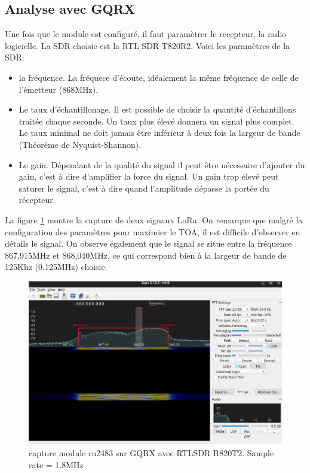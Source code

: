\subsection{Analyse avec GQRX}

Une fois que le module est configuré, il faut paramètrer le recepteur, la radio logicielle. La SDR choisie est la RTL SDR T820R2. Voici les paramètres de la SDR:

\vspace{0.1cm}

\begin{itemize}
\item la fréquence. La fréquece d'écoute, idéalement la même fréquence de celle de l'émetteur (868MHz).
\item Le taux d'échantillonage. Il est possible de choisir la quantité d'échantillons traitée chaque seconde. Un taux plus élevé donnera un signal plus complet. Le taux minimal ne doit jamais être inférieur à deux fois la largeur de bande (Théorème de Nyquist-Shannon).
\item Le gain. Dépendant de la qualité du signal il peut être nécessaire d'ajouter du gain, c'est à dire d'amplifier la force du signal. Un gain trop élevé peut saturer le signal, c'est à dire quand l'amplitude dépasse la portée du récepteur.
\end{itemize}

\vspace{0.1cm}

La figure \ref{term301} montre la capture de deux signaux LoRa. On remarque que malgré la configuration des paramètres pour maximier le TOA, il est difficile d'observer en détails le signal. On observe également que le signal se situe entre la fréquence 867,915MHz et 868,040MHz, ce qui correspond bien à la largeur de bande de 125Khz (0.125MHz) choisie.

\begin{figure}[h]
\centering

\includegraphics[scale=0.28]{images/gqrx4.png}
\caption{capture module rn2483 sur GQRX avec RTLSDR R820T2. Sample rate = 1.8MHz}\label{term301}
\end{figure}

